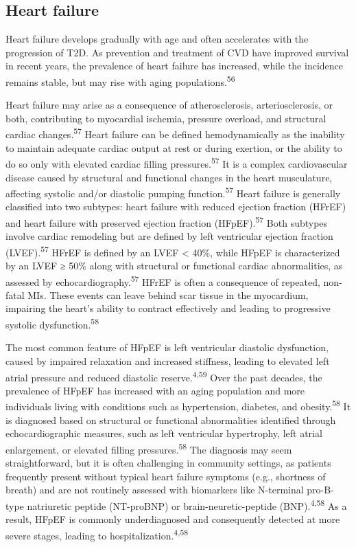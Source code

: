 \documentclass[
  a4paper,
  headsepline=true,
  open=left]{scrbook}
\begin{document}
\hypertarget{heart-failure}{%
\subsection{Heart failure}\label{heart-failure}}

Heart failure develops gradually with age and often accelerates with the
progression of T2D. As prevention and treatment of CVD have improved
survival in recent years, the prevalence of heart failure has increased,
while the incidence remains stable, but may rise with aging
populations.\textsuperscript{56}

Heart failure may arise as a consequence of atherosclerosis,
arteriosclerosis, or both, contributing to myocardial ischemia, pressure
overload, and structural cardiac changes.\textsuperscript{57} Heart
failure can be defined hemodynamically as the inability to maintain
adequate cardiac output at rest or during exertion, or the ability to do
so only with elevated cardiac filling pressures.\textsuperscript{57} It
is a complex cardiovascular disease caused by structural and functional
changes in the heart musculature, affecting systolic and/or diastolic
pumping function.\textsuperscript{57} Heart failure is generally
classified into two subtypes: heart failure with reduced ejection
fraction (HFrEF) and heart failure with preserved ejection fraction
(HFpEF).\textsuperscript{57} Both subtypes involve cardiac remodeling
but are defined by left ventricular ejection fraction
(LVEF).\textsuperscript{57} HFrEF is defined by an LVEF \textless{}
40\%, while HFpEF is characterized by an LVEF ≥ 50\% along with
structural or functional cardiac abnormalities, as assessed by
echocardiography.\textsuperscript{57} HFrEF is often a consequence of
repeated, non-fatal MIs. These events can leave behind scar tissue in
the myocardium, impairing the heart's ability to contract effectively
and leading to progressive systolic dysfunction.\textsuperscript{58}

The most common feature of HFpEF is left ventricular diastolic
dysfunction, caused by impaired relaxation and increased stiffness,
leading to elevated left atrial pressure and reduced diastolic
reserve.\textsuperscript{4,59} Over the past decades, the prevalence of
HFpEF has increased with an aging population and more individuals living
with conditions such as hypertension, diabetes, and
obesity.\textsuperscript{58} It is diagnosed based on structural or
functional abnormalities identified through echocardiographic measures,
such as left ventricular hypertrophy, left atrial enlargement, or
elevated filling pressures.\textsuperscript{58} The diagnosis may seem
straightforward, but it is often challenging in community settings, as
patients frequently present without typical heart failure symptoms
(e.g., shortness of breath) and are not routinely assessed with
biomarkers like N-terminal pro-B-type natriuretic peptide (NT-proBNP) or
brain-neuretic-peptide (BNP).\textsuperscript{4,58} As a result, HFpEF
is commonly underdiagnosed and consequently detected at more severe
stages, leading to hospitalization.\textsuperscript{4,58}
\end{document}
